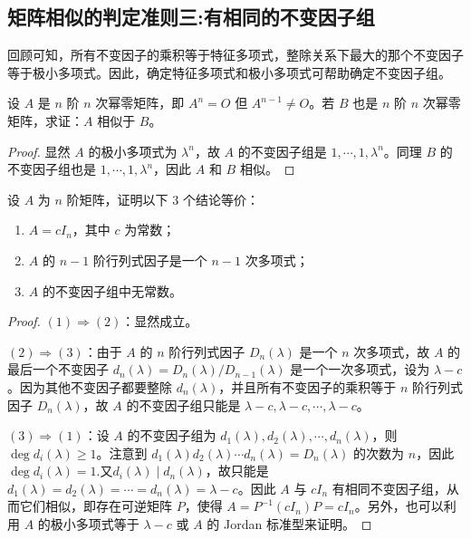 \documentclass[../../main.tex]{subfiles}
\begin{document}
\subsection{矩阵相似的判定准则三:有相同的不变因子组}

回顾可知，所有不变因子的乘积等于特征多项式，整除关系下最大的那个不变因子等于极小多项式。因此，确定特征多项式和极小多项式可帮助确定不变因子组。

\begin{proposition}[同阶幂零阵必相似]\label{proposition:同阶幂零阵必相似}
设 \(A\) 是 \(n\) 阶 \(n\) 次幂零矩阵，即 \(A^n = O\) 但 \(A^{n - 1}\neq O\)。若 \(B\) 也是 \(n\) 阶 \(n\) 次幂零矩阵，求证：\(A\) 相似于 \(B\)。
\end{proposition}
\begin{proof}
显然 \(A\) 的极小多项式为 \(\lambda^n\)，故 \(A\) 的不变因子组是 \(1,\cdots,1,\lambda^n\)。同理 \(B\) 的不变因子组也是 \(1,\cdots,1,\lambda^n\)，因此 \(A\) 和 \(B\) 相似。
\end{proof}

\begin{proposition}\label{proposition:纯量阵关于不变因子和行列式因子的等价条件}
设 \(A\) 为 \(n\) 阶矩阵，证明以下 3 个结论等价：
\begin{enumerate}[(1)]
\item  \(A = cI_n\)，其中 \(c\) 为常数；

\item  \(A\) 的 \(n - 1\) 阶行列式因子是一个 \(n - 1\) 次多项式；

\item \(A\) 的不变因子组中无常数。
\end{enumerate}
\end{proposition}
\begin{proof}
\((1)\Rightarrow(2)\)：显然成立。

\((2)\Rightarrow(3)\)：由于 \(A\) 的 \(n\) 阶行列式因子 \(D_n(\lambda)\) 是一个 \(n\) 次多项式，故 \(A\) 的最后一个不变因子 \(d_n(\lambda)=D_n(\lambda)/D_{n - 1}(\lambda)\) 是一个一次多项式，设为 \(\lambda - c\)。因为其他不变因子都要整除 \(d_n(\lambda)\)，并且所有不变因子的乘积等于 \(n\) 阶行列式因子 \(D_n(\lambda)\)，故 \(A\) 的不变因子组只能是 \(\lambda - c,\lambda - c,\cdots,\lambda - c\)。 

\((3)\Rightarrow(1)\)：设 \(A\) 的不变因子组为 \(d_1(\lambda),d_2(\lambda),\cdots,d_n(\lambda)\)，则 \(\deg d_i(\lambda)\geq1\)。注意到 \(d_1(\lambda)d_2(\lambda)\cdots d_n(\lambda)=D_n(\lambda)\) 的次数为 \(n\)，因此$\deg d_i(\lambda)=1$.又\(d_i(\lambda)\mid d_n(\lambda)\)，故只能是 \(d_1(\lambda)=d_2(\lambda)=\cdots=d_n(\lambda)=\lambda - c\)。因此 \(A\) 与 \(cI_n\) 有相同不变因子组，从而它们相似，即存在可逆矩阵 \(P\)，使得 \(A = P^{-1}(cI_n)P = cI_n\)。另外，也可以利用 \(A\) 的极小多项式等于 \(\lambda - c\) 或 \(A\) 的 Jordan 标准型来证明。
\end{proof}
\end{document}
